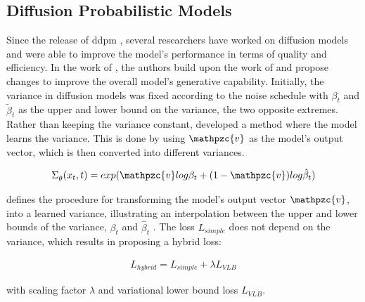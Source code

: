 \subsection{Diffusion Probabilistic Models}
\label{ch:preliminaries-diffusionProbabilisticModelsTabularData}

Since the release of \gls{ddpm} \cite{ho2020DenoisingDiffusionProbabilistic}, several researchers have worked on diffusion \glspl{model} and were able to improve the \gls{model}'s performance in terms of quality and efficiency.
In the work of \textcite{nichol2021ImprovedDenoisingDiffusion}, the authors build upon the work of \textcite{ho2020DenoisingDiffusionProbabilistic} and propose changes to improve the overall \gls{model}'s generative capability.
Initially, the variance in diffusion \glspl{model} was fixed according to the noise schedule with $\beta_t$ and $\tilde{\beta}_t$ as the upper and lower bound on the variance, the two opposite extremes.
Rather than keeping the variance constant, \textcite{nichol2021ImprovedDenoisingDiffusion} developed a method where the \gls{model} learns the variance. 
This is done by using $\mathpzc{v}$ as the \gls{model}'s output vector, which is then converted into different variances.

\begin{equation}
    \label{eqn:impr_diff}
    \begin{align*}
        \Sigma_{\theta}^{}(x_t,t)=exp(\mathpzc{v}log\beta_t+(1-\mathpzc{v})log\hat{\beta}_t)
    \end{align*}
\end{equation}

 defines the procedure for transforming the \gls{model}'s output vector $\mathpzc{v}$, into a learned variance, illustrating an interpolation between the upper and lower bounds of the variance, $\beta_t$ and $\hat{\beta}_t$ \cite{nichol2021ImprovedDenoisingDiffusion}.
The loss $L_{simple}$ does not depend on the variance, which results in \cite{nichol2021ImprovedDenoisingDiffusion} proposing a hybrid loss:

\begin{equation}
    \label{eqn:l_hybrid}
    \begin{align*}
        L_{hybrid} =L_{simple}+\lambda L_{VLB}
    \end{align*}
\end{equation}

with scaling factor $\lambda$ and variational lower bound loss $L_{VLB}$.

